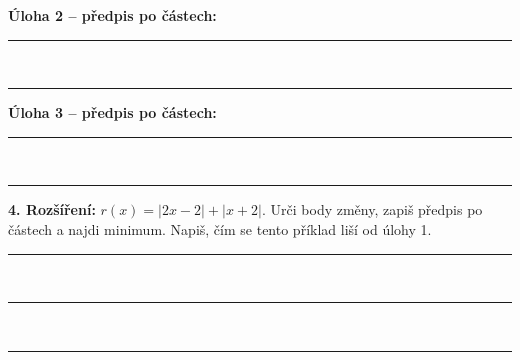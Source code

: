 \documentclass[11pt,a4paper]{article}
\begin{document}
\textbf{Úloha 2 – předpis po částech:}\\[2mm]\rule{\linewidth}{.4pt}\\[4mm]\rule{\linewidth}{.4pt}
\medskip
\textbf{Úloha 3 – předpis po částech:}\\[2mm]\rule{\linewidth}{.4pt}\\[4mm]\rule{\linewidth}{.4pt}
\medskip
\textbf{4. Rozšíření:} $r(x)=|2x-2|+|x+2|$. Urči body změny, zapiš předpis po částech a najdi minimum. Napiš, čím se tento příklad liší od úlohy 1.\\[3mm]
\rule{\linewidth}{.4pt}\\[6mm]\rule{\linewidth}{.4pt}\\[6mm]\rule{\linewidth}{.4pt}
\end{document}
